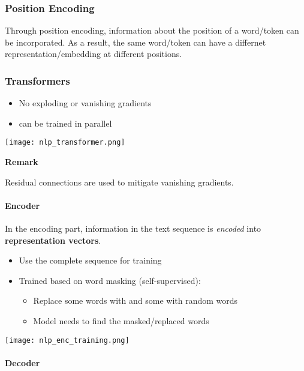 \subsubsection{Position Encoding}
Through position encoding, information about the position of a word/token can be incorporated. As a result, the same word/token can have a differnet representation/embedding at different positions.

\subsubsection{Transformers}
\begin{itemize}
    \item No exploding or vanishing gradients
    \item can be trained in parallel
\end{itemize}
\begin{center}
    \texttt{[image: nlp\_transformer.png]}
\end{center}

\textbf{Remark}

Residual connections are used to mitigate vanishing gradients.

\paragraph{Encoder}
In the encoding part, information in the text sequence is \textit{encoded} into \textbf{representation vectors}.
\newpar{}
\begin{itemize}
    \item Use the complete sequence for training
    \item Trained based on word masking (self-supervised):
          \begin{itemize}
              \item Replace some words with  and some with random words
              \item Model needs to find the masked/replaced words
          \end{itemize}
\end{itemize}
\begin{center}
    \texttt{[image: nlp\_enc\_training.png]}
\end{center}


\paragraph{Decoder}

